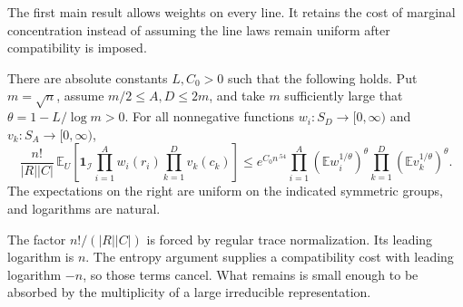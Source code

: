 The first main result allows weights on every line. It retains the cost of marginal concentration instead of assuming the line laws remain uniform after compatibility is imposed.
\begin{theorem}\label{tra:duality:weighted}\label{tra:duality:weighted-statement}
There are absolute constants $L,C_0>0$ such that the following holds. Put $m=\sqrt n$, assume $m/2\le A,D\le2m$, and take $m$ sufficiently large that $\theta=1-L/\log m>0$. For all nonnegative functions $w_i:S_D\to[0,\infty)$ and $v_k:S_A\to[0,\infty)$,
\begin{equation}\label{tra:duality:eq5}
 \frac{n!}{|R||C|}\,
 \mathbb E_U\!\left[\mathbf1_{\mathcal I}
       \prod_{i=1}^A w_i(r_i)\prod_{k=1}^D v_k(c_k)\right]
 \le e^{C_0n^{.54}}
       \prod_{i=1}^A(\mathbb E w_i^{1/\theta})^\theta
       \prod_{k=1}^D(\mathbb E v_k^{1/\theta})^\theta .
\end{equation}
The expectations on the right are uniform on the indicated symmetric groups, and logarithms are natural.
\end{theorem}
The factor $n!/(|R||C|)$ is forced by regular trace normalization. Its leading logarithm is $n$. The entropy argument supplies a compatibility cost with leading logarithm $-n$, so those terms cancel. What remains is small enough to be absorbed by the multiplicity of a large irreducible representation.

